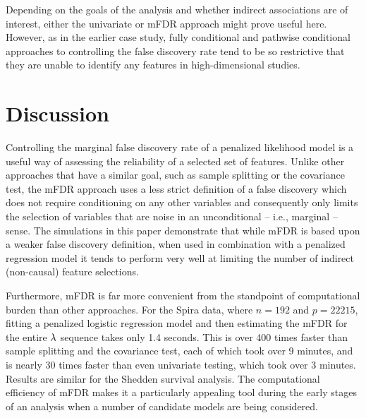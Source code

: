 Depending on the goals of the analysis and whether indirect associations are of interest, either the univariate or mFDR approach might prove useful here.
However, as in the earlier case study, fully conditional and pathwise conditional approaches to controlling the false discovery rate tend to be so restrictive that they are unable to identify any features in high-dimensional studies.

\section{Discussion}

Controlling the marginal false discovery rate of a penalized likelihood model is a useful way of assessing the reliability of a selected set of features. Unlike other approaches that have a similar goal, such as sample splitting or the covariance test, the mFDR approach uses a less strict definition of a false discovery which does not require conditioning on any other variables and consequently only limits the selection of variables that are noise in an unconditional -- i.e., marginal -- sense.  The simulations in this paper demonstrate that while mFDR is based upon a weaker false discovery definition, when used in combination with a penalized regression model it tends to perform very well at limiting the number of indirect (non-causal) feature selections.


Furthermore, mFDR is far more convenient from the standpoint of computational burden than other approaches. For the Spira data, where $n = 192$ and $p =22215$, fitting a penalized logistic regression model and then estimating the mFDR for the entire $\lambda$ sequence takes only 1.4 seconds.  This is over 400 times faster than sample splitting and the covariance test, each of which took over 9 minutes, and is nearly 30 times faster than even univariate testing, which took over 3 minutes.
Results are similar for the Shedden survival analysis.  The computational efficiency of mFDR makes it a particularly appealing tool during the early stages of an analysis when a number of candidate models are being considered.

